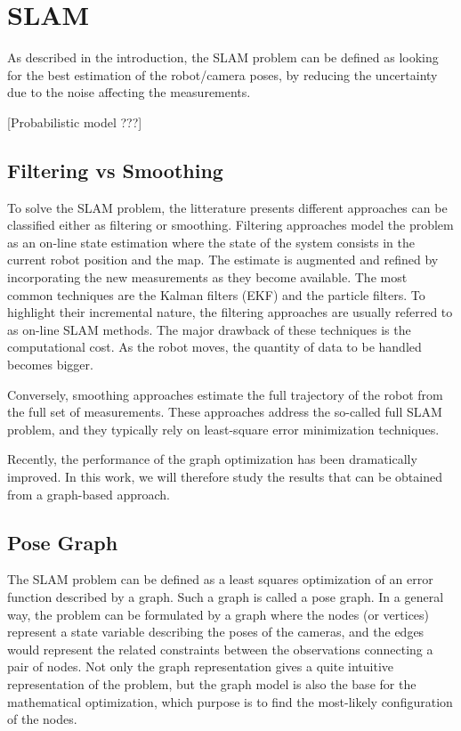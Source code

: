 \documentclass[a4paper,11pt]{kth-mag}
\begin{document}
\section{SLAM}

As described in the introduction, the SLAM problem can be defined as looking for the best estimation of the robot/camera poses, by reducing the uncertainty due to the noise affecting the measurements.

[Probabilistic model ???]

\subsection{Filtering vs Smoothing}

To solve the SLAM problem, the litterature presents different approaches can be classified either as filtering or smoothing. Filtering approaches model the problem as an on-line state estimation where the state of the system consists in the current robot position and the map. The estimate is augmented and refined by incorporating the new measurements as they become available.
The most common techniques are the Kalman filters (EKF) and the particle filters. To highlight their incremental nature, the filtering approaches are usually referred to as on-line SLAM methods.
The major drawback of these techniques is the computational cost. As the robot moves, the quantity of data to be handled becomes bigger.

Conversely, smoothing approaches estimate the full trajectory of the robot from the full set of measurements. These approaches address the so-called full SLAM problem, and they typically rely on least-square error minimization techniques.

Recently, the performance of the graph optimization has been dramatically improved. In this work, we will therefore study the results that can be obtained from a graph-based approach.

\subsection{Pose Graph}

The SLAM problem can be defined as a least squares optimization of an error function described by a graph. Such a graph is called a pose graph. In a general way, the problem can be formulated by a graph where the nodes (or vertices) represent a state variable describing the poses of the cameras, and the edges would represent the related constraints between the observations connecting a pair of nodes. Not only the graph representation gives a quite intuitive representation of the problem, but the graph model is also the base for the mathematical optimization, which purpose is to find the most-likely configuration of the nodes.
\end{document}
